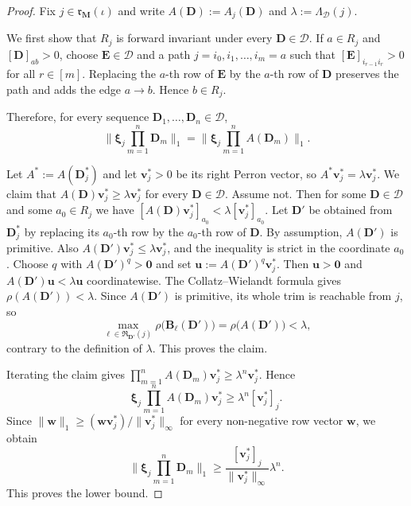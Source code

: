 \documentclass[12pt]{iopart}
\newcommand*{\bbbxi}{\boldsymbol{\xi}}
\begin{document}
\begin{proof}
Fix $j\in\mathfrak r_{\mathbf M}(\iota)$ and write
$A(\mathbf D):=A_j(\mathbf D)$ and $\lambda:=\Lambda_{\mathcal D}(j)$.

We first show that $R_j$ is forward invariant under every $\mathbf D\in\mathcal D$.
If $a\in R_j$ and $[\mathbf D]_{ab}>0$, choose $\mathbf E\in\mathcal D$ and a path
$j=i_0,i_1,\ldots,i_m=a$ such that $[\mathbf E]_{i_{r-1}i_r}>0$ for all $r\in[m]$.
Replacing the $a$-th row of $\mathbf E$ by the $a$-th row of $\mathbf D$ preserves the path and adds the edge $a\to b$.
Hence $b\in R_j$.

Therefore, for every sequence $\mathbf D_1,\ldots,\mathbf D_n\in\mathcal D$,
\[
\bigg\|
\bbbxi_j\prod_{m=1}^n \mathbf D_m
\bigg\|_1
=
\bigg\|
\bbbxi_j\prod_{m=1}^n A(\mathbf D_m)
\bigg\|_1.
\]

Let $A^*:=A(\mathbf D_j^*)$ and let $\mathbf v_j^*>0$ be its right Perron vector, so
$A^*\mathbf v_j^*=\lambda\mathbf v_j^*$.
We claim that $A(\mathbf D)\mathbf v_j^*\ge \lambda\mathbf v_j^*$ for every $\mathbf D\in\mathcal D$.
Assume not.
Then for some $\mathbf D\in\mathcal D$ and some $a_0\in R_j$ we have
$[A(\mathbf D)\mathbf v_j^*]_{a_0}<\lambda[\mathbf v_j^*]_{a_0}$.
Let $\mathbf D'$ be obtained from $\mathbf D_j^*$ by replacing its $a_0$-th row by the $a_0$-th row of $\mathbf D$.
By assumption, $A(\mathbf D')$ is primitive.
Also $A(\mathbf D')\mathbf v_j^*\le \lambda\mathbf v_j^*$, and the inequality is strict in the coordinate $a_0$.
Choose $q$ with $A(\mathbf D')^q>\mathbf 0$ and set $\mathbf u:=A(\mathbf D')^q\mathbf v_j^*$.
Then $\mathbf u>\mathbf 0$ and $A(\mathbf D')\mathbf u<\lambda\mathbf u$ coordinatewise.
The Collatz--Wielandt formula gives $\rho(A(\mathbf D'))<\lambda$.
Since $A(\mathbf D')$ is primitive, its whole trim is reachable from $j$, so
\[
\max_{\ell\in\mathfrak R_{\mathbf D'}(j)}
\rho\big(\mathbf B_\ell(\mathbf D')\big)
=
\rho\big(A(\mathbf D')\big)
<
\lambda,
\]
contrary to the definition of $\lambda$.
This proves the claim.

Iterating the claim gives
$\prod_{m=1}^n A(\mathbf D_m)\mathbf v_j^*\ge \lambda^n\mathbf v_j^*$.
Hence
\[
\bbbxi_j\prod_{m=1}^n A(\mathbf D_m)\mathbf v_j^*
\ge
\lambda^n[\mathbf v_j^*]_j.
\]
Since $\|\mathbf w\|_1\ge (\mathbf w\mathbf v_j^*)/\|\mathbf v_j^*\|_\infty$ for every non-negative row vector $\mathbf w$, we obtain
\[
\bigg\|
\bbbxi_j\prod_{m=1}^n \mathbf D_m
\bigg\|_1
\ge
\frac{[\mathbf v_j^*]_j}{\|\mathbf v_j^*\|_\infty}\lambda^n.
\]
This proves the lower bound.


\end{proof}
\end{document}
